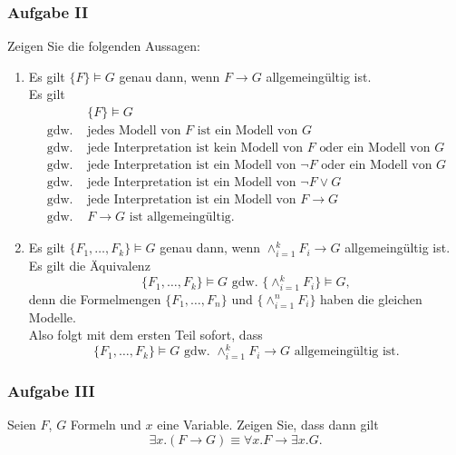 \subsubsection*{Aufgabe II}
Zeigen Sie die folgenden Aussagen:
\begin{enumerate}
    \item Es gilt $\{F\} \models G$ genau dann, wenn $F \to G$ allgemeingültig ist.\\
    \LOES Es gilt
    \begin{align*}
        &\{F\} \models G \\
        \text{gdw. } &\text{jedes Modell von } F \text{ ist ein Modell von } G \\
        \text{gdw. } &\text{jede Interpretation ist kein Modell von } F \text{ oder ein Modell von } G \\
        \text{gdw. } &\text{jede Interpretation ist ein Modell von } \lnot F \text{ oder ein Modell von } G \\
        \text{gdw. } &\text{jede Interpretation ist ein Modell von } \lnot F \lor G  \\
        \text{gdw. } &\text{jede Interpretation ist ein Modell von } F \to G \\
        \text{gdw. } & F \to G \text{ ist allgemeingültig. }
    \end{align*}

    \item Es gilt $\{F_1,\dots,F_k\} \models G$ genau dann, wenn $\land_{i=1}^k F_i \to G$ allgemeingültig ist. \\
    \LOES Es gilt die Äquivalenz
    \begin{equation*}
        \{F_1, \dots ,F_k\} \models G \text{ gdw. } \{\land_{i=1}^k F_i\} \models G,
    \end{equation*}
    denn die Formelmengen $\{F_1,\dots ,F_n \}$ und $\{ \land_{i=1}^n F_i \}$ haben die gleichen Modelle. \\
    Also folgt mit dem ersten Teil sofort, dass
    \begin{equation*}
        \{ F_1, \dots , F_k \} \models G \text{ gdw. } \land_{i=1}^k F_i \to G \text{ allgemeingültig ist.}
    \end{equation*}
\end{enumerate}

\subsubsection*{Aufgabe III}
    Seien $F$, $G$ Formeln und $x$ eine Variable. Zeigen Sie, dass dann gilt
    \begin{equation*}
    \exists x.(F \to G) \equiv \forall x. F \to \exists x. G.
    \end{equation*}

